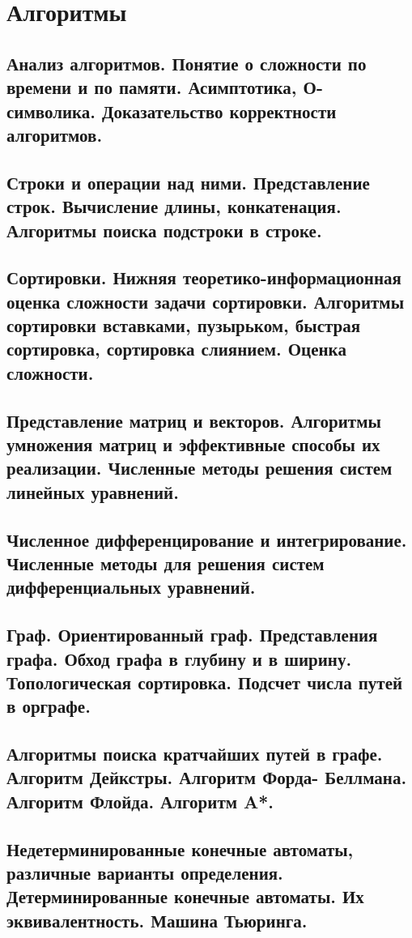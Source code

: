 \chapter{Алгоритмы}

\begin{multicols}{2}
    \raggedcolumns

    \section{Анализ алгоритмов. Понятие о сложности по времени и по памяти. Асимптотика, О-
    символика. Доказательство корректности алгоритмов.}

    \section{Строки и операции над ними. Представление строк. Вычисление длины, конкатенация.
    Алгоритмы поиска подстроки в строке.}

    \section{Сортировки. Нижняя теоретико-информационная оценка сложности задачи сортировки.
    Алгоритмы сортировки вставками, пузырьком, быстрая сортировка, сортировка
    слиянием. Оценка сложности.}

    \section{Представление матриц и векторов. Алгоритмы умножения матриц и эффективные
    способы их реализации. Численные методы решения систем линейных уравнений.}

    \section{Численное дифференцирование и интегрирование. Численные методы для решения
    систем дифференциальных уравнений.}

    \section{Граф. Ориентированный граф. Представления графа. Обход графа в глубину и в ширину.
    Топологическая сортировка. Подсчет числа путей в орграфе.}

    \section{Алгоритмы поиска кратчайших путей в графе. Алгоритм Дейкстры. Алгоритм Форда-
    Беллмана. Алгоритм Флойда. Алгоритм A*.}
    \columnbreak
    \section{Недетерминированные конечные автоматы, различные варианты определения.
    Детерминированные конечные автоматы. Их эквивалентность. Машина Тьюринга.}
\end{multicols}